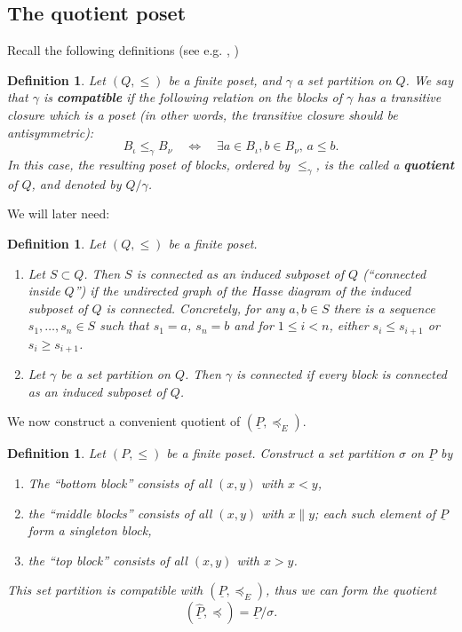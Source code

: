 \documentclass[11pt,a4paper,abstract=yes]{scrartcl}
\theoremstyle{plain}
\newtheorem{definition}[theorem]{Definition}
\newcommand{\transerel}{\preceq_{E}}
\newcommand{\Pairs}[1]{\underline{#1}}
\newcommand{\Ppairs}{\Pairs{P}}
\newcommand{\PairsQuotient}[1]{\widehat{\Pairs{#1}}}
\newcommand{\Pqu}{\PairsQuotient{P}}
\newcommand{\pqurel}{\preceq}
\begin{document}
\subsection{The quotient poset}
\label{sec:orgcca35bf}
Recall the following definitions (see e.g. \autocite{StanleyTwoPosetPolytopes}, \autocite{AhmadOrderChain})
\begin{definition}
Let \((Q,\le)\) be a finite poset, and \(\gamma\) a set partition  on \(Q\).
We say that \(\gamma\) is \textbf{compatible} if the following relation on the blocks of \(\gamma\) has a transitive closure which is
a poset (in other words, the transitive closure should be antisymmetric):
\[
B_{\iota} \le_{\gamma} B_{\nu} \quad \iff \quad \exists a \in B_{\iota}, b \in B_{\nu}, \, a \le b.
\]
In this case, the resulting poset of blocks, ordered by \(\le_{\gamma}\), is the called a \textbf{quotient} of \(Q\),
and denoted by \(Q/\gamma\).
\label{def-set-partition-compatible}
\end{definition}
We will later need:
\begin{definition}
Let \((Q,\le)\) be a finite poset.
\begin{enumerate}
\item Let \(S \subset Q\). Then \(S\) is \emph{connected} as an induced subposet of \(Q\) (``connected inside \(Q\)'')
if the undirected graph of the Hasse diagram of the induced subposet of \(Q\) is connected.
Concretely, for any \(a,b \in S\) there is a sequence \(s_1,\dots, s_n \in S\)
such that \(s_1=a\), \(s_n=b\) and for \(1 \le i < n\), either \(s_i \le s_{i+1}\) or \(s_i \ge s_{i+1}\).
\item Let \(\gamma\) be a set partition  on \(Q\). Then \(\gamma\) is \emph{connected} if every block
is connected as an induced subposet of \(Q\).
\end{enumerate}
\label{def-set-partition-connected}
\end{definition}

We now construct a convenient  quotient of \((\Ppairs, \transerel)\).
\begin{definition}
Let \((P,\le)\) be a finite poset.
Construct a set partition \(\sigma\) on \(\Ppairs\) by
\begin{enumerate}
\item The ``bottom block''  consists of all \((x,y)\) with \(x < y\),
\item the ``middle blocks'' consists of all \((x,y)\) with \(x \parallel y\); each such element of \(\Ppairs\)
form a singleton block,
\item the ``top block'' consists of all \((x,y)\) with \(x > y\).
\end{enumerate}

This set partition is compatible with \((\Ppairs, \transerel)\), thus we can form the
quotient
\[(\Pqu, \pqurel) = \Ppairs/\sigma. \]
\label{def-quotient-poset}
\end{definition}
\end{document}

